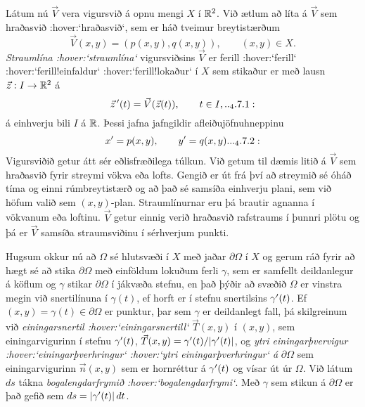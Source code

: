 \noindent
Látum nú $\vec V$ vera vigursvið á opnu mengi $X$ í ${\mathbb R}^2$.  Við ætlum
að líta á $\vec V$ sem hraðasvið :hover:`hraðasvið`, sem er háð tveimur breytistærðum
$$
\vec V(x,y)= (p(x,y), q(x,y)), \qquad (x,y)\in X.
$$
{\it Straumlína :hover:`straumlína`} vigursviðsins $\vec V$ er
ferill :hover:`ferill` :hover:`ferill!einfaldur` :hover:`ferill!lokaður`
í $X$ sem stikaður er með lausn $\vec z:I\to {\mathbb R}^2$ á
\begin{equation*}
\vec z\, \dash(t)=\vec V(\vec z(t)), \qquad t\in I,


.. _4.7.1:

\end{equation*}
á einhverju bili $I$ á ${\mathbb R}$.  Þessi jafna jafngildir afleiðujöfnuhneppinu
\begin{equation*}
x\dash=p(x,y), \qquad y\dash=q(x,y).


.. _4.7.2:

\end{equation*}
Vigursviðið getur átt sér eðlisfræðilega túlkun.  Við getum til dæmis
litið á $\vec V$ sem hraðasvið fyrir streymi vökva eða lofts.  Gengið
er út frá því að streymið sé óháð tíma og einni rúmbreytistærð og að
það sé samsíða einhverju plani, sem við höfum valið sem $(x,y)$-plan. 
Straumlínurnar eru þá brautir agnanna í vökvanum eða loftinu.  $\vec V$
getur einnig verið hraðasvið rafstraums  í þunnri plötu og þá er
$\vec V$ samsíða straumsviðinu í sérhverjum punkti.



Hugsum okkur nú að ${\Omega}$ sé hlutsvæði í $X$ með jaðar
${\partial} {\Omega}$ í $X$ og gerum ráð fyrir að hægt sé að stika
${\partial}{\Omega}$ með einföldum lokuðum ferli ${\gamma}$, sem er samfellt
deildanlegur á köflum og ${\gamma}$ stikar ${\partial}{\Omega}$ í
jákvæða stefnu, en það þýðir að svæðið ${\Omega}$ er vinstra megin við
snertilínuna í ${\gamma}(t)$, ef horft er í stefnu snertilsins
${\gamma}{\sp{\prime}}(t)$. Ef $(x,y)={\gamma}(t)\in {\partial}{\Omega}$ er
punktur, þar sem ${\gamma}$ er deildanlegt fall, þá
skilgreinum við {\it einingarsnertil :hover:`einingarsnertill`}
$\vec T(x,y)$ í $(x,y)$, sem einingarvigurinn í stefnu
${\gamma}{\sp{\prime}}(t)$, $\vec T(x,y)={\gamma}{\sp{\prime}}(t)/|{\gamma}'(t)|$,
og {\it ytri
einingarþvervigur :hover:`einingarþverhringur` :hover:`ytri
einingarþverhringur` á} ${\partial}{\Omega}$ sem
einingarvigurinn $\vec n(x,y)$ sem er hornréttur á
${\gamma}{\sp{\prime}}(t)$ og vísar út úr ${\Omega}$. Við
látum $ds$ tákna {\it bogalengdarfrymið :hover:`bogalengdarfrymi`}.
Með ${\gamma}$ sem stikun á ${\partial}{\Omega}$ er það gefið sem
$ds=|{\gamma}{\sp{\prime}}(t)|\, dt$.



